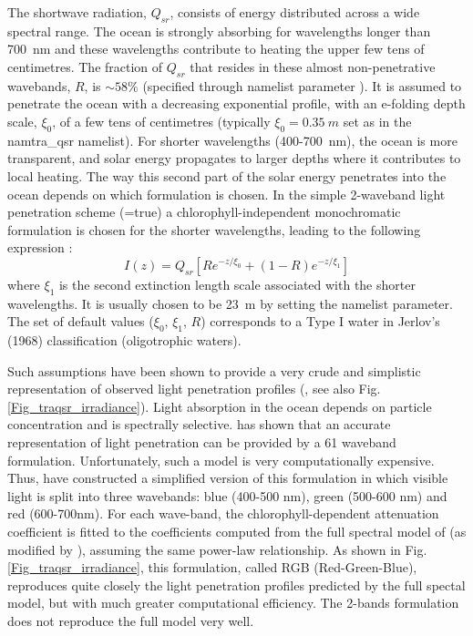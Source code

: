 The shortwave radiation,  $Q_{sr}$, consists of energy distributed across a wide spectral range. 
The ocean is strongly absorbing for wavelengths longer than 700~nm and these 
wavelengths contribute to heating the upper few tens of centimetres. The fraction of $Q_{sr}$ 
that resides in these almost non-penetrative wavebands, $R$, is $\sim 58\%$ (specified 
through namelist parameter ).  It is assumed to penetrate the ocean 
with a decreasing exponential profile, with an e-folding depth scale, $\xi_0$, 
of a few tens of centimetres (typically $\xi_0=0.35~m$ set as  in the namtra\_qsr namelist).
For shorter wavelengths (400-700~nm), the ocean is more transparent, and solar energy 
propagates to larger depths where it contributes to 
local heating. 
The way this second part of the solar energy penetrates into the ocean depends on 
which formulation is chosen. In the simple 2-waveband light penetration scheme  (=true) 
a chlorophyll-independent monochromatic formulation is chosen for the shorter wavelengths, 
leading to the following expression  \citep{Paulson1977}:
\begin{equation} \label{Eq_traqsr_iradiance}
I(z) = Q_{sr} \left[Re^{-z / \xi_0} + \left( 1-R\right) e^{-z / \xi_1} \right]
\end{equation}
where $\xi_1$ is the second extinction length scale associated with the shorter wavelengths.  
It is usually chosen to be 23~m by setting the  namelist parameter. 
The set of default values ($\xi_0$, $\xi_1$, $R$) corresponds to a Type I water in 
Jerlov's (1968) classification (oligotrophic waters).

Such assumptions have been shown to provide a very crude and simplistic 
representation of observed light penetration profiles (\cite{Morel_JGR88}, see also 
Fig.\ref{Fig_traqsr_irradiance}). Light absorption in the ocean depends on 
particle concentration and is spectrally selective. \cite{Morel_JGR88} has shown 
that an accurate representation of light penetration can be provided by a 61 waveband 
formulation. Unfortunately, such a model is very computationally expensive. 
Thus, \cite{Lengaigne_al_CD07} have constructed a simplified version of this 
formulation in which visible light is split into three wavebands: blue (400-500 nm), 
green (500-600 nm) and red (600-700nm). For each wave-band, the chlorophyll-dependent 
attenuation coefficient is fitted to the coefficients computed from the full spectral model 
of \cite{Morel_JGR88} (as modified by \cite{Morel_Maritorena_JGR01}), assuming 
the same power-law relationship. As shown in Fig.\ref{Fig_traqsr_irradiance}, 
this formulation, called RGB (Red-Green-Blue), reproduces quite closely 
the light penetration profiles predicted by the full spectal model, but with much greater 
computational efficiency. The 2-bands formulation does not reproduce the full model very well. 

